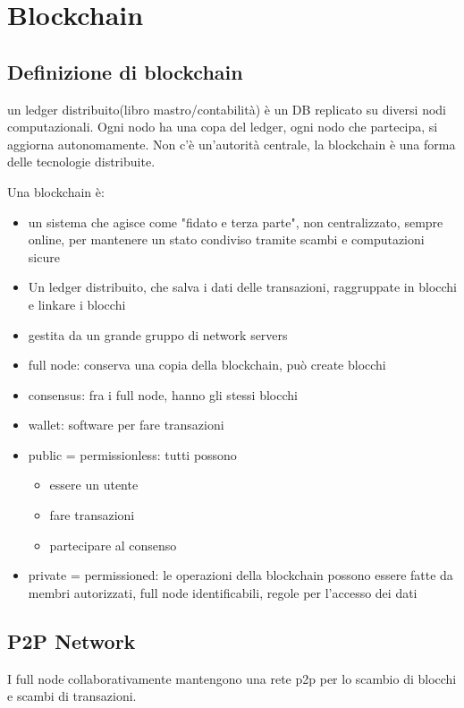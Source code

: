 \section{Blockchain}
\subsection{Definizione di blockchain}
un ledger distribuito(libro mastro/contabilità) è un DB replicato su diversi nodi computazionali.
Ogni nodo ha una copa del ledger, ogni nodo che partecipa, si aggiorna autonomamente.
Non c'è un'autorità centrale, la blockchain è una forma delle tecnologie distribuite.

Una blockchain è:
\begin{itemize}
    \item un sistema che agisce come "fidato e terza parte", non centralizzato, sempre online, per mantenere un stato condiviso tramite scambi e computazioni sicure
    \item Un ledger distribuito, che salva i dati delle transazioni, raggruppate in blocchi e linkare i blocchi
    \item gestita da un grande gruppo di network servers
    \item full node: conserva una copia della blockchain, può create blocchi
    \item consensus: fra i full node, hanno gli stessi blocchi
    \item wallet: software per fare transazioni
    \item public = permissionless: tutti possono
        \begin{itemize}
            \item essere un utente
            \item fare transazioni
            \item partecipare al consenso
        \end{itemize}
    \item private = permissioned: le operazioni della blockchain possono essere fatte da membri autorizzati, full node identificabili, regole per l'accesso dei dati
\end{itemize}

\subsection{P2P Network}

I full node collaborativamente mantengono una rete p2p per lo scambio di blocchi e scambi di transazioni.

